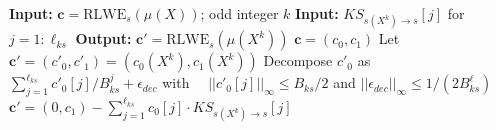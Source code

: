 \begin{algorithm}
\caption{RLWE Substitution Algorithm $\mathsf{Subs}(c, k)$}
\label{alg:ORAM:8}
\begin{algorithmic}[1] %
    \State \textbf{Input:} $\mathbf{c} = \mathrm{RLWE}_s(\mu(X))$; odd integer $k$
    \State \textbf{Input:} $KS_{s(X^k)\to s}[j]$ for $j = 1 : \ell_{ks}$
    \State \textbf{Output:} $\mathbf{c'} = \mathrm{RLWE}_s(\mu(X^k))$
    \State $\mathbf{c} = (c_0, c_1)$
    \State Let $\mathbf{c'} = (c'_0, c'_1) = (c_0(X^k), c_1(X^k))$
    \State Decompose $c'_0$ as $\sum_{j=1}^{\ell_{ks}} c'_0[j]/B^j_{ks} + \epsilon_{dec}$ with
    \Statex $\quad||c'_0[j]||_\infty \leq B_{ks}/2$ and $||\epsilon_{dec}||_\infty\leq 1/(2B^\ell_{ks})$
    \State\Return $\mathbf{c'} = (0, c_1) - \sum_{j=1}^{\ell_{ks}} c_0[j] \cdot KS_{s(X^k)\to s}[j]$
\end{algorithmic}
\end{algorithm}